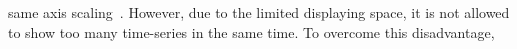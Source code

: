 \documentclass[format=acmsmall, review=false, screen=true]{acmart}
\newcommand{\name}{{DeepTracker}\xspace}
\newcommand{\ea}{{$\mathrm{E}_a$}\xspace}
\newcommand{\eb}{{$\mathrm{E}_b$}\xspace}
\newcommand{\ec}{{$\mathrm{E}_c$}\xspace}
\newcommand{\td}{\textcolor[rgb]{0,0,0}}
\begin{document}
same axis scaling~\cite{javed2010graphical}. However, due to the limited displaying space, it is not allowed to show too many time-series in the same time. To overcome this disadvantage, %
\end{document}
